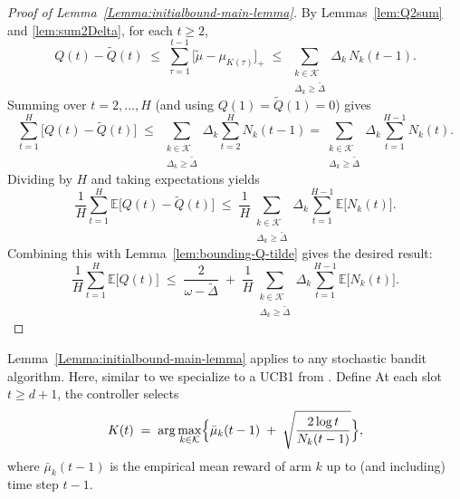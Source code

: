 \documentclass[12pt,draftcls, onecolumn]{IEEEtran}
\newcommand{\vedisc}{\omega}
\begin{document}
{\begin{proof}[Proof of Lemma~\ref{Lemma:initialbound-main-lemma}]
By Lemmas~\ref{lem:Q2sum} and \ref{lem:sum2Delta}, for each \(t\ge2\),
\[
Q(t) - \widetilde{Q}(t)
\;\le\;
\sum_{\tau=1}^{t-1}\bigl[\widetilde{\mu}-\mu_{K(\tau)}\bigr]_+
\;\le\;
\sum_{\substack{k\in\mathcal{K}\\\Delta_k \ge \tilde{\Delta}}}
\Delta_k\,N_k(t-1).
\]
Summing over \(t=2,\dots,H\) (and using \(Q(1)=\widetilde{Q}(1)=0\)) gives
\[
\sum_{t=1}^H\bigl[Q(t)-\widetilde{Q}(t)\bigr]
\;\le\;
\sum_{\substack{k\in\mathcal{K}\\\Delta_k \ge \tilde{\Delta}}}
\Delta_k
\sum_{t=2}^H N_k(t-1)
=
\sum_{\substack{k\in\mathcal{K}\\\Delta_k \ge \tilde{\Delta}}}
\Delta_k
\sum_{t=1}^{H-1} N_k(t).
\]
Dividing by \(H\) and taking expectations yields
\[
\frac{1}{H}\sum_{t=1}^H \mathbb{E}\bigl[Q(t)-\widetilde{Q}(t)\bigr]
\;\le\;
\frac{1}{H}
\sum_{\substack{k\in\mathcal{K}\\\Delta_k \ge \tilde{\Delta}}}
\Delta_k
\sum_{t=1}^{H-1}\mathbb{E}\bigl[N_k(t)\bigr].
\]
Combining this with Lemma~\ref{lem:bounding-Q-tilde} gives the desired result:
\[
\frac{1}{H}\sum_{t=1}^H \mathbb{E}\bigl[Q(t)\bigr]
\;\le\;
\frac{2}{\vedisc - \tilde{\Delta}}
\;+\;
\frac{1}{H}
\sum_{\substack{k\in\mathcal{K}\\\Delta_k \ge \tilde{\Delta}}}
\Delta_k
\sum_{t=1}^{H-1}\mathbb{E}\bigl[N_k(t)\bigr].
\]
\end{proof}





Lemma~\ref{Lemma:initialbound-main-lemma} applies to any stochastic bandit algorithm.  Here, similar to \cite{Kleinberg2003} we specialize to a UCB1  from \cite{Auer2002FinitetimeAO}.  Define
At each slot \(t\ge{d}+1\), the controller selects
\[
K(t)
\;=\;
\arg\max_{k\in\mathcal{K}}
\Bigl\{
\bar\mu_k(t-1)
\;+\;
\sqrt{\frac{2\log t}{N_k(t-1)}}
\Bigr\},
\]
where \(\bar\mu_k(t-1)\) is the empirical mean reward of arm \(k\) up to (and including)
time step \(t-1\).



\begin{algorithm}[ht]
\caption{UCB1}
\label{alg:ucb-queue}
\end{algorithm}


}
\end{document}

